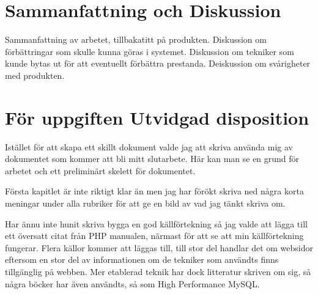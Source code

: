 \section{Sammanfattning och Diskussion}

Sammanfattning av arbetet, tillbakatitt på produkten. Diskussion om förbättringar som skulle kunna göras i systemet. Diskussion om tekniker som kunde bytas ut för att eventuellt förbättra prestanda. Deiskussion om svårigheter med produkten.

\section{För uppgiften Utvidgad disposition}

Istället för att skapa ett skillt dokument valde jag att skriva använda mig av dokumentet som kommer att bli mitt slutarbete. Här kan man se en grund för arbetet och ett preliminärt skelett för dokumentet.

Första kapitlet är inte riktigt klar än men jag har förökt skriva ned några korta meningar under alla rubriker för att ge en bild av vad jag tänkt skriva om.

Har ännu inte hunit skriva bygga en god källförtekning så jag valde att lägga till ett översatt citat från PHP manualen, närmast för att se att min källförtekning fungerar. Flera källor kommer att läggas till, till stor del handlar det om websidor eftersom en stor del av informationen om de tekniker som användts finns tillgänglig på webben. Mer etablerad teknik har dock litteratur skriven om sig, så några böcker har även användts, så som \cite{hiperfmysql} High Performance MySQL.


